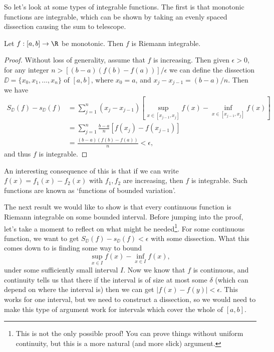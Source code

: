 \documentclass[a4paper]{scrartcl}
\begin{document}
So let's look at some types of integrable functions. The first is that monotonic functions are integrable, which can be shown by taking an evenly spaced dissection causing the sum to telescope.

\begin{proposition}
	Let $f:[a, b] \rightarrow \R$ be monotonic. Then $f$ is Riemann integrable.
\end{proposition}
\begin{proof}
	Without loss of generality, assume that $f$ is increasing. Then given $\epsilon > 0$, for any integer $n > [(b - a)(f(b)- f(a))]/\epsilon$ we can define the dissection $\DD = \{x_0, x_1, \dots, x_n\}$ of $[a, b]$, where $x_0 = a$, and $x_{j} - x_{j - 1} = (b - a)/n$. Then we have
	\begin{align*}
		S_{\DD}(f) - s_{\DD}(f) &= \sum_{j = 1}^n (x_{j} - x_{j - 1})\left[\sup_{x \in [x_{j - 1}, x_j]} f(x) - \inf_{x \in [x_{j - 1}, x_j]} f(x)\right] \\
&= \sum_{j = 1}^n \frac{b - a}{n}\left[f(x_j) - f(x_{j - 1})\right] \\
&= \frac{(b - a)(f(b) - f(a))}{n} < \epsilon,
	\end{align*}
	and thus $f$ is integrable.
\end{proof}

An interesting consequence of this is that if we can write $f(x) = f_1(x) - f_2(x)$ with $f_1, f_2$ are increasing, then $f$ is integrable. Such functions are known as `functions of bounded variation'. 

The next result we would like to show is that every continuous function is Riemann integrable on some bounded interval. Before jumping into the proof, let's take a moment to reflect on what might be needed\footnote{This is not the only possible proof! You can prove things without uniform continuity, but this is a more natural (and more slick) argument.}. For some continuous function, we want to get $S_{\DD}(f) - s_{\DD}(f) < \epsilon$ with some dissection. What this comes down to is finding some way to bound
$$
\sup_{x \in I}f(x) - \inf_{x \in I} f(x),
$$
under some sufficiently small interval $I$. 
Now we know that $f$ is continuous, and continuity tells us that there if the interval is of size at most some $\delta$ (which can depend on where the interval is) then we can get $|f(x) - f(y)| < \epsilon$. 
This works for one interval, but we need to construct a dissection, so we would need to make this type of argument work for intervals which cover the whole of $[a, b]$.
\end{document}
